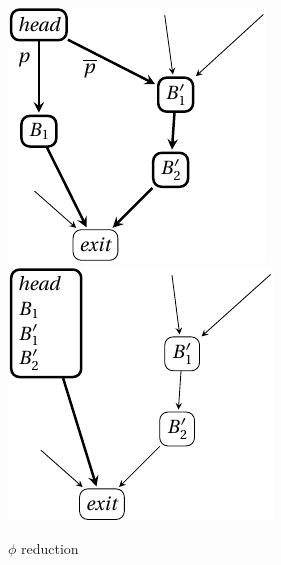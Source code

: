 \begin{figure}[h]
  \includegraphics[scale=0.7]{paths_reduction_a.pdf}\hspace{0.5cm}\includegraphics[scale=0.7]{paths_reduction_b.pdf}
  \caption{$\phi$ reduction\label{fig:paths_reduction}}
\end{figure}

